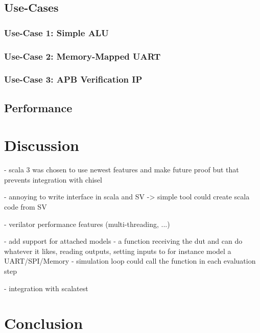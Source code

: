 \documentclass[11pt]{report}
\begin{document}
\section{Use-Cases} %

\subsection{Use-Case 1: Simple ALU} %

\subsection{Use-Case 2: Memory-Mapped UART} %

\subsection{Use-Case 3: APB Verification IP} %

\section{Performance} %

\chapter{Discussion} %

- scala 3 was chosen to use newest features and make future proof but that prevents integration with chisel

- annoying to write interface in scala and SV -> simple tool could create scala code from SV


- verilator performance features (multi-threading, ...)

- add support for attached models
- a function receiving the dut and can do whatever it likes, reading outputs, setting inputs to for instance model a
UART/SPI/Memory
- simulation loop could call the function in each evaluation step

- integration with scalatest

\chapter{Conclusion} %

\printbibliography
\end{document}
